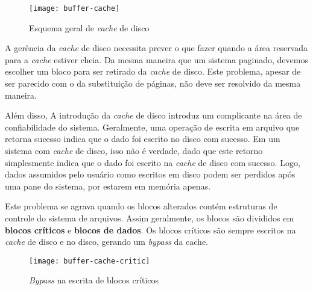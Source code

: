 \begin{figure}[h]
  \centering
  \texttt{[image: buffer-cache]}
  \caption{Esquema geral de \textit{cache} de disco}
  \label{fig:buffer-cache}
\end{figure}

A gerência da \textit{cache} de disco necessita prever o que fazer quando a área reservada para a \textit{cache} estiver cheia. Da mesma maneira que um sistema paginado, devemos escolher um bloco para ser retirado da \textit{cache} de disco. Este problema, apesar de ser parecido com o da substituição de páginas, não deve ser resolvido da mesma maneira.

Além disso, A introdução da \textit{cache} de disco introduz um complicante na área de confiabilidade do sistema. Geralmente, uma operação de escrita em arquivo que retorna sucesso indica que o dado foi escrito no disco com sucesso. Em um sistema com \textit{cache} de disco, isso não é verdade, dado que este retorno simplesmente indica que o dado foi escrito na \textit{cache} de disco com sucesso. Logo, dados assumidos pelo usuário como escritos em disco podem ser perdidos após uma pane do sistema, por estarem em memória apenas.

Este problema se agrava quando os blocos alterados contém estruturas de controle do sistema de arquivos. Assim geralmente, os blocos são divididos em \textbf{blocos críticos} e \textbf{blocos de dados}. Os blocos críticos são sempre escritos na \textit{cache} de disco e no disco, gerando um \textit{bypass} da cache.

\begin{figure}[h]
  \centering
  \texttt{[image: buffer-cache-critic]}
  \caption{\textit{Bypass} na escrita de blocos críticos}
  \label{fig:buffer-cache-critic}
\end{figure}
